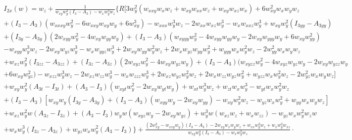 \documentclass[12pt,a4paper]{article}
\begin{document}
	\begin{multline}
	  I_{2x}(w) = w_z + \frac{1}{w_{xy} w_y^2 \left( I_3 - A_3 \right) - w_x w_y^3 w_z} \biggl\{ R \biggl[ 3 w_y^2 \left(w_{xxy} w_x w_z + w_{xy} w_{xx} w_z + w_{xy} w_{xz} w_x \right) + 6 w_{xy}^2 w_x w_y w_z \\
	  + \left( I_3 - A_3 \right) \left( w_{xxxy} w_y^2 - 6 w_{xxy} w_{xy} w_y + 6 w_{xy}^3 \right)
	  - w_{xxx} w_y^3 w_z - 2 w_{xx} w_{xz} w_y^3 - w_x w_{xxz} w_y^3
	  + w_{xy} w_y^2 \left(I_{3yy} - A_{3yy}\right) \\
	  + \left( I_{3y} - A_{3y} \right) \left(2 w_{xyy} w_y^2 - 4 w_{xy} w_{yy} w_y \right)
	    + \left( I_3 - A_3 \right) \left( w_{xyyy} w_y^2 - 4 w_{xyy} w_{yy} w_y - 2 w_{xy} w_{yyy} w_y
		+ 6 w_{xy} w_{yy}^2 \right) \\
    	- w_{xyy} w_y^3 w_z - 2 w_{xy} w_{yz} w_y^3 - w_x w_{yyz} w_y^3 + 2 w_{xy} w_{yy} w_y^2 w_z + 2 w_x w_{yz} w_{yy} w_y^2 + w_{yyy} w_x w_y^2 w_z - 2 w_{yy}^2 w_x w_y w_z \\
	  + w_{xz} w_y^2 \left(I_{3zz} - A_{3zz}\right)
	  + \left( I_{3z} - A_{3z} \right) \left(2 w_{xyz} w_y^2 - 4 w_{xy} w_{yz} w_y\right)
	    + \left( I_3 - A_3 \right) \biggl( w_{xyzz} w_y^2 - 4 w_{xyz} w_{yz} w_y - 2 w_{xy} w_{yzz} w_y \\
		+ 6 w_{xy} w_{yz}^2 \biggr)
    	- w_{xzz} w_y^3 w_z - 2 w_{xz} w_{zz} w_y^3 - w_x w_{zzz} w_y^3 + 2 w_{xz} w_{yz} w_y^2 w_z + 2 w_x w_{zz} w_{yz} w_y^2 + w_{yzz} w_x w_y^2 w_z - 2 w_{yz}^2 w_x w_y w_z \biggr] \\
	  +  w_{xy} w_y^2 \left(A_{3t} - I_{3t}\right)
	  + \left( A_3 - I_3 \right) \left(w_{xyt} w_y^2 - 2 w_{xy} w_{yt} w_y\right) + w_{xt} w_y^3 w_z + w_{zt} w_x w_y^3 - w_{yt} w_x w_y^2 w_z \\
	  + \left(I_3 - A_3\right) \left[ w_{xy} w_y \left(I_{3y} - A_{3y}\right)
	   + \left( I_3 - A_3 \right) \left(w_{xyy} w_y - 2 w_{xy} w_{yy}\right) - w_{xy} w_y^2 w_z - w_{yz} w_x w_y^2 + w_{yy} w_x w_y w_z \right] \\
	  +  w_{xz} w_y^2 w \left(A_{3z} - I_{3z}\right)
	  + \left( A_3 - I_3 \right) w_y w \left(w_{xyz} w_y - 2 w_{xy} w_{yz}\right)
	  + w_y^3 w \left(w_{xz} w_z + w_x w_{zz}\right) - w_{yz} w_x w_y^2 w_z w \\
	  + w_x w_y^3 \left(I_{3z} - A_{3z}\right) + w_{yz} w_x w_y^2 \left(A_3 - I_3\right) \biggr\}
      + \frac{\left( 2 w_{xy}^2 - w_{xxy} w_y \right) \left( I_3 - A_3 \right) - 2 w_{xy} w_x w_y w_z + w_{xx} w_y^2 w_z + w_x w_y^2 w_{xz}}{w_{xy} w_y^4 \left( I_3 - A_3\right) - w_x w_y^5 w_z} \cdot \\

\end{multline}
\end{document}
